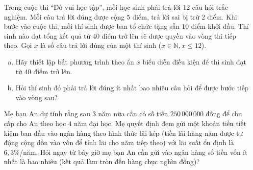 \begin{bt}%
Trong cuộc thi ``Đố vui học tập'', mỗi học sinh phải trả lời $12$ câu hỏi trắc nghiệm. Mỗi câu trả lời đúng được cộng $5$ điểm, trả lời sai bị trừ $2$ điểm. Khi bước vào cuộc thi, mỗi thí sinh được ban tổ chức tặng sẵn $10$ điểm khởi đầu. Thí sinh nào đạt tổng kết quả từ $40$ điểm trở lên sẽ được quyền vào vòng thi tiếp theo. Gọi $x$ là số câu trả lời đúng của một thí sinh ($x \in \mathbb{N}, x \le 12$).
\begin{enumerate}[a)]
    \item Hãy thiết lập bất phương trình theo ẩn $x$ biểu diễn điều kiện để thí sinh đạt từ $40$ điểm trở lên.
    \item Hỏi thí sinh đó phải trả lời đúng ít nhất bao nhiêu câu hỏi để được bước tiếp vào vòng sau?
\end{enumerate}
\end{bt}

\begin{bt}%
Mẹ bạn An dự tính rằng sau $3$ năm nữa cần có số tiền $250\,000\,000$ đồng để chu cấp cho An theo học $4$ năm đại học. Mẹ quyết định đem gửi một khoản tiền tiết kiệm ban đầu vào ngân hàng theo hình thức lãi kép (tiền lãi hàng năm được tự động cộng dồn vào vốn để tính lãi cho năm tiếp theo) với lãi suất ổn định là $6{,}3\%$/năm. Hỏi ngay từ bây giờ mẹ bạn An cần gửi vào ngân hàng số tiền vốn ít nhất là bao nhiêu (kết quả làm tròn đến hàng chục nghìn đồng)?
\end{bt}

